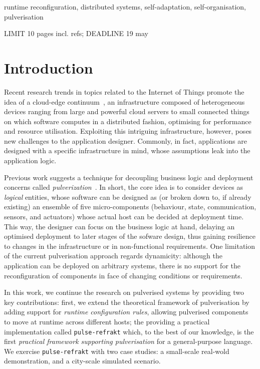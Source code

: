 \documentclass[conference]{IEEEtran}
\newcommand{\meta}[1]{{\color{blue}#1}}
\begin{document}
\begin{IEEEkeywords}
runtime reconfiguration, distributed systems, self-adaptation, self-organisation, pulverisation
\end{IEEEkeywords}

\newcommand{\ourframework}{\texttt{pulse-refrakt}}

\meta{LIMIT 10 pages incl. refs; DEADLINE 19 may}

\section{Introduction}\label{sec:introduction}

Recent research trends in topics related to the Internet of Things promote the idea of a cloud-edge continuum~\cite{DBLP:journals/iot/BittencourtISFM18},
an infrastructure composed of heterogeneous devices ranging from large and powerful cloud servers to small connected things
on which software computes in a distributed fashion,
optimising for performance and resource utilisation.
%
Exploiting this intriguing infrastructure, however, poses new challenges to the application designer.
%
Commonly, in fact, applications are designed with a specific infrastructure in mind,
whose assumptions leak into the application logic.

Previous work suggests a technique for decoupling business logic and deployment concerns
called \emph{pulverization}~\cite{FI2020-pulverization}.
%
In short, the core idea is to consider devices as \emph{logical} entities,
whose software can be designed as (or broken down to, if already existing) an ensemble of five micro-components
(behaviour, state, communication, sensors, and actuators)
whose actual host can be decided at deployment time.
%
This way, the designer can focus on the business logic at hand,
delaying an optimised deployment to later stages of the sofware design,
thus gaining resilience to changes in the infrastructure or in non-functional requirements.
%
One limitation of the current pulverisation approach regards dynamicity:
although the application can be deployed on arbitrary systems,
there is no support for the reconfiguration of components in face of changing conditions or requirements.

In this work,
we continue the research on pulverised systems by providing two key contributions:
first, we extend the theoretical framework of pulverisation by adding support for
\emph{runtime configuration rules}, allowing pulverised components to move at runtime across different hosts;
the providing a practical implementation called \ourframework{} which,
to the best of our knowledge,
is the first \emph{practical framework supporting pulverisation} for a general-purpose language.
%
We exercise \ourframework{} with two case studies:
a small-scale real-wold demonstration, and a city-scale simulated scenario.
\end{document}
